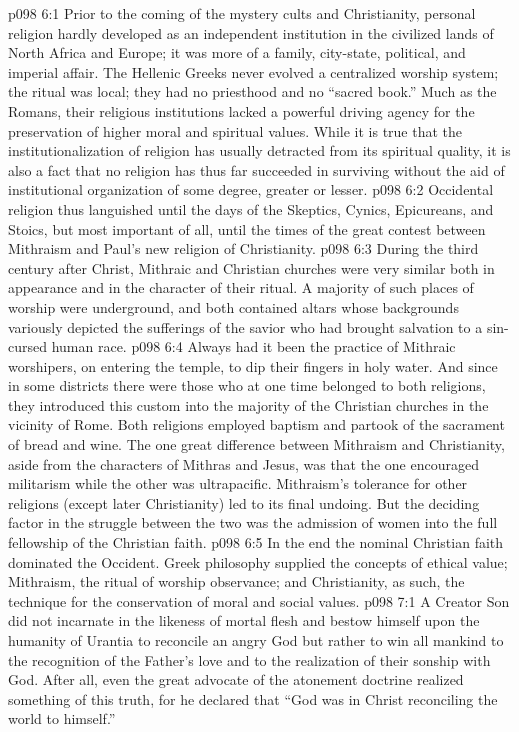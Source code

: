 \vs p098 6:1 Prior to the coming of the mystery cults and Christianity, personal religion hardly developed as an independent institution in the civilized lands of North Africa and Europe; it was more of a family, city\hyp{}state, political, and imperial affair. The Hellenic Greeks never evolved a centralized worship system; the ritual was local; they had no priesthood and no “sacred book.” Much as the Romans, their religious institutions lacked a powerful driving agency for the preservation of higher moral and spiritual values. While it is true that the institutionalization of religion has usually detracted from its spiritual quality, it is also a fact that no religion has thus far succeeded in surviving without the aid of institutional organization of some degree, greater or lesser.
\vs p098 6:2 Occidental religion thus languished until the days of the Skeptics, Cynics, Epicureans, and Stoics, but most important of all, until the times of the great contest between Mithraism and Paul’s new religion of Christianity.
\vs p098 6:3 \pc During the third century after Christ, Mithraic and Christian churches were very similar both in appearance and in the character of their ritual. A majority of such places of worship were underground, and both contained altars whose backgrounds variously depicted the sufferings of the savior who had brought salvation to a sin\hyp{}cursed human race.
\vs p098 6:4 Always had it been the practice of Mithraic worshipers, on entering the temple, to dip their fingers in holy water. And since in some districts there were those who at one time belonged to both religions, they introduced this custom into the majority of the Christian churches in the vicinity of Rome. Both religions employed baptism and partook of the sacrament of bread and wine. The one great difference between Mithraism and Christianity, aside from the characters of Mithras and Jesus, was that the one encouraged militarism while the other was ultrapacific. Mithraism’s tolerance for other religions (except later Christianity) led to its final undoing. But the deciding factor in the struggle between the two was the admission of women into the full fellowship of the Christian faith.
\vs p098 6:5 \pc In the end the nominal Christian faith dominated the Occident. Greek philosophy supplied the concepts of ethical value; Mithraism, the ritual of worship observance; and Christianity, as such, the technique for the conservation of moral and social values.
\vs p098 7:1 A Creator Son did not incarnate in the likeness of mortal flesh and bestow himself upon the humanity of Urantia to reconcile an angry God but rather to win all mankind to the recognition of the Father’s love and to the realization of their sonship with God. After all, even the great advocate of the atonement doctrine realized something of this truth, for he declared that “God was in Christ reconciling the world to himself.”

